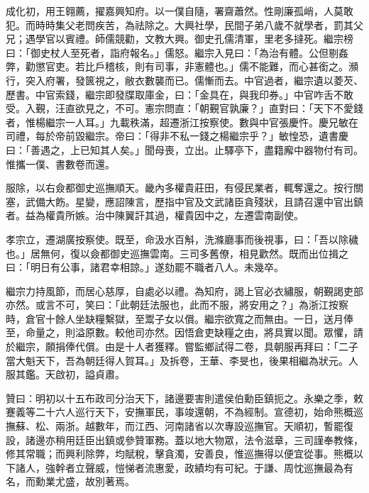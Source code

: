 \begin{pinyinscope}
成化初，用王翱薦，擢嘉興知府。以一僕自隨，署齋蕭然。性剛廉孤峭，人莫敢犯。而時時集父老問疾苦，為祛除之。大興社學，民間子弟八歲不就學者，罰其父兄；遇學官以賓禮。師儒競勸，文教大興。御史孔儒清軍，里老多撻死。繼宗榜曰：「御史杖人至死者，詣府報名。」儒怒。繼宗入見曰：「為治有體。公但剔姦弊，勸懲官吏。若比戶稽核，則有司事，非憲體也。」儒不能難，而心甚銜之。瀕行，突入府署，發篋視之，敝衣數襲而已。儒慚而去。中官過者，繼宗遺以菱芡、歷書。中官索錢，繼宗即發牒取庫金，曰：「金具在，與我印券。」中官咋舌不敢受。入覲，汪直欲見之，不可。憲宗問直：「朝覲官孰廉？」直對曰：「天下不愛錢者，惟楊繼宗一人耳。」九載秩滿，超遷浙江按察使。數與中官張慶忤。慶兄敏在司禮，每於帝前毀繼宗。帝曰：「得非不私一錢之楊繼宗乎？」敏惶恐，遺書慶曰：「善遇之，上已知其人矣。」聞母喪，立出。止驛亭下，盡籍廨中器物付有司。惟攜一僕、書數卷而還。

服除，以右僉都御史巡撫順天。畿內多權貴莊田，有侵民業者，輒奪還之。按行關塞，武備大飭。星變，應詔陳言，歷指中官及文武諸臣貪殘狀，且請召還中官出鎮者。益為權貴所嫉。治中陳翼訐其過，權貴因中之，左遷雲南副使。

孝宗立，遷湖廣按察使。既至，命汲水百斛，洗滌廳事而後視事，曰：「吾以除穢也。」居無何，復以僉都御史巡撫雲南。三司多舊僚，相見歡然。既而出位揖之曰：「明日有公事，諸君幸相諒。」遂劾罷不職者八人。未幾卒。

繼宗力持風節，而居心慈厚，自處必以禮。為知府，謁上官必衣繡服，朝覲謁吏部亦然。或言不可，笑曰：「此朝廷法服也，此而不服，將安用之？」為浙江按察時，倉官十餘人坐缺糧繫獄，至鬻子女以償。繼宗欲寬之而無由。一日，送月俸至，命量之，則溢原數。較他司亦然。因悟倉吏缺糧之由，將具實以聞。眾懼，請於繼宗，願捐俸代償。由是十人者獲釋。嘗監鄉試得二卷，具朝服再拜曰：「二子當大魁天下，吾為朝廷得人賀耳。」及拆卷，王華、李旻也，後果相繼為狀元。人服其鑑。天啟初，謚貞肅。

贊曰：明初以十五布政司分治天下，諸邊要害則遣侯伯勳臣鎮扼之。永樂之季，敕蹇義等二十六人巡行天下，安撫軍民，事竣還朝，不為經制。宣德初，始命熊概巡撫蘇、松、兩浙。越數年，而江西、河南諸省以次專設巡撫官。天順初，暫罷復設，諸邊亦稍用廷臣出鎮或參贊軍務。蓋以地大物眾，法令滋章，三司謹奉教條，修其常職；而興利除弊，均賦稅，擊貪濁，安善良，惟巡撫得以便宜從事。熊概以下諸人，強幹者立聲威，愷悌者流惠愛，政績均有可紀。于謙、周忱巡撫最為有名，而勳業尤盛，故別著焉。


\end{pinyinscope}